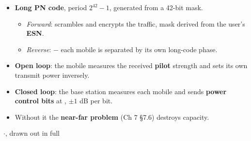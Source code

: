 {\begin{itemize}
  \begin{itemize}
    \item Applied on the I and Q arms after Walsh spreading.
    \item Each cell or sector uses one of , so the short code
          \textbf{identifies the sector}.
  \end{itemize}
  \item \textbf{Long PN code}, period $2^{42}-1$, generated from a 42-bit mask.
  \begin{itemize}
    \item \emph{Forward}: scrambles and encrypts the traffic, mask derived from the user's
          \textbf{ESN}.
    \item \emph{Reverse}:  $-$ each mobile is separated by
          its own long-code phase.
  \end{itemize}
\end{itemize}

\begin{itemize}
  \item \textbf{Open loop}: the mobile measures the received \textbf{pilot} strength and
        sets its own transmit power inversely.
  \item \textbf{Closed loop}: the base station measures each mobile and sends
        \textbf{power control bits} at , $\pm 1$ dB per bit.
  \item Without it the \textbf{near-far problem} (Ch 7 \S7.6) destroys capacity.
\end{itemize}}


{\color{sub}\footnotesize {} 
\gap$\cdot$\gap {}, drawn out in full}

